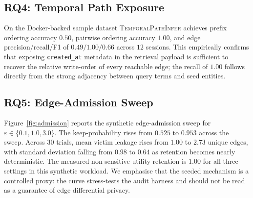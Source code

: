 \documentclass[journal,10pt,twocolumn]{IEEEtran}
\begin{document}
\subsection{RQ4: Temporal Path Exposure}
On the Docker-backed sample dataset \textsc{TemporalPathInfer}
achieves prefix ordering accuracy $0.50$, pairwise ordering accuracy
$1.00$, and edge precision/recall/F1 of $0.49/1.00/0.66$ across $12$
sessions. This empirically confirms that exposing \texttt{created\_at}
metadata in the retrieval payload is sufficient to recover the
relative write-order of every reachable edge; the recall of $1.00$
follows directly from the strong adjacency between query terms and
seed entities.

\subsection{RQ5: Edge-Admission Sweep}
Figure~\ref{fig:admission} reports the synthetic edge-admission sweep
for $\varepsilon \in \{0.1, 1.0, 3.0\}$. The keep-probability rises
from $0.525$ to $0.953$ across the sweep. Across $30$ trials, mean
victim leakage rises from $1.00$ to $2.73$ unique edges, with standard
deviation falling from $0.98$ to $0.64$ as retention becomes nearly
deterministic. The measured non-sensitive utility retention is $1.00$
for all three settings in this synthetic workload. We emphasise that
the seeded mechanism is a controlled proxy: the curve stress-tests
the audit harness and should not be read as a guarantee of edge
differential privacy.
\end{document}
